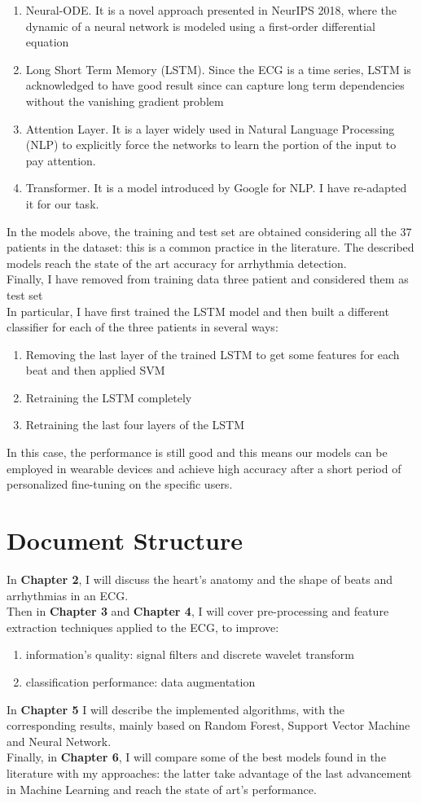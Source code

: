\documentclass[LaM,binding=0.6cm]{sapthesis}
\begin{document}
\begin{enumerate}
\item Neural-ODE. It is a novel approach presented in NeurIPS 2018, where the dynamic of a neural network is modeled using a first-order differential equation
\item Long Short Term Memory (LSTM). Since the ECG is a time series, LSTM is acknowledged to have good result since can capture long term dependencies without the vanishing gradient problem
\item Attention Layer. It is a layer widely used in Natural Language Processing (NLP) to explicitly force the networks to learn the portion of the input to pay attention. 
\item Transformer. It is a model introduced by Google for NLP. I have re-adapted it for our task.
\end{enumerate}  
In the models above, the training and test set are obtained considering all the 37 patients in the dataset: this is a common practice in the literature. The described models reach the state of the art accuracy for arrhythmia detection.\\Finally, I have removed from training data three patient and considered them as test set\\In particular, I have first trained the LSTM model and then  built a different classifier for each of the three patients in several ways:
\begin{enumerate}
\item Removing the last layer of the trained LSTM to get some features for each beat and then applied SVM
\item Retraining the LSTM completely 
\item Retraining the last four layers of the LSTM 
\end{enumerate}
In this case, the performance is still good and this means our models can be employed in wearable devices and achieve high accuracy after a short period of personalized fine-tuning on the specific users.   
\section{Document Structure}
In \textbf{Chapter 2}, I will discuss the heart's anatomy and the shape of beats and arrhythmias in an ECG.\\Then in \textbf{Chapter 3} and \textbf{Chapter 4}, I will cover pre-processing and feature extraction techniques applied to the ECG, to improve:
\begin{enumerate}
\item information's quality: signal filters and discrete wavelet transform
\item classification performance: data augmentation 
\end{enumerate}
In \textbf{Chapter 5} I will describe the implemented algorithms, with the corresponding results, mainly based on Random Forest, Support Vector Machine and Neural Network.\\Finally, in \textbf{Chapter 6}, I will compare some of the best models found in the literature with my approaches: the latter take advantage of the last advancement in Machine Learning and reach the state of art's performance.
\end{document}
